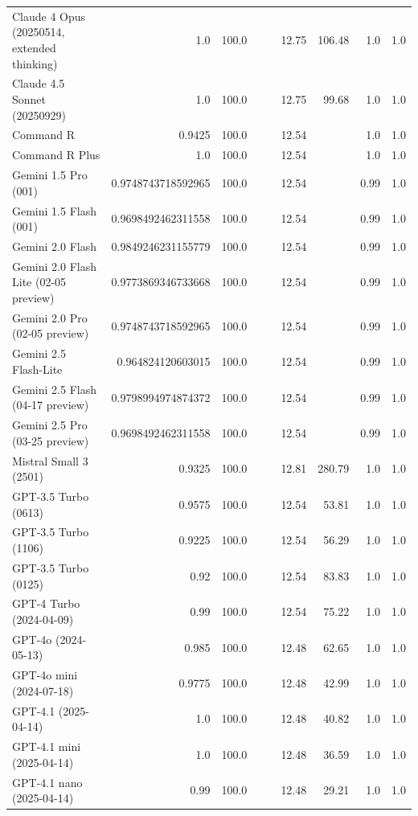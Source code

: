 \begin{table}[htp]
{\begin{tabular}{lrrrrrrrr}
Claude 4 Opus (20250514, extended thinking) & 1.0 & 100.0 &  &  & 12.75 & 106.48 & 1.0 & 1.0 \\
Claude 4.5 Sonnet (20250929) & 1.0 & 100.0 &  &  & 12.75 & 99.68 & 1.0 & 1.0 \\
Command R & 0.9425 & 100.0 &  &  & 12.54 &  & 1.0 & 1.0 \\
Command R Plus & 1.0 & 100.0 &  &  & 12.54 &  & 1.0 & 1.0 \\
Gemini 1.5 Pro (001) & 0.9748743718592965 & 100.0 &  &  & 12.54 &  & 0.99 & 1.0 \\
Gemini 1.5 Flash (001) & 0.9698492462311558 & 100.0 &  &  & 12.54 &  & 0.99 & 1.0 \\
Gemini 2.0 Flash & 0.9849246231155779 & 100.0 &  &  & 12.54 &  & 0.99 & 1.0 \\
Gemini 2.0 Flash Lite (02-05 preview) & 0.9773869346733668 & 100.0 &  &  & 12.54 &  & 0.99 & 1.0 \\
Gemini 2.0 Pro (02-05 preview) & 0.9748743718592965 & 100.0 &  &  & 12.54 &  & 0.99 & 1.0 \\
Gemini 2.5 Flash-Lite & 0.964824120603015 & 100.0 &  &  & 12.54 &  & 0.99 & 1.0 \\
Gemini 2.5 Flash (04-17 preview) & 0.9798994974874372 & 100.0 &  &  & 12.54 &  & 0.99 & 1.0 \\
Gemini 2.5 Pro (03-25 preview) & 0.9698492462311558 & 100.0 &  &  & 12.54 &  & 0.99 & 1.0 \\
Mistral Small 3 (2501) & 0.9325 & 100.0 &  &  & 12.81 & 280.79 & 1.0 & 1.0 \\
GPT-3.5 Turbo (0613) & 0.9575 & 100.0 &  &  & 12.54 & 53.81 & 1.0 & 1.0 \\
GPT-3.5 Turbo (1106) & 0.9225 & 100.0 &  &  & 12.54 & 56.29 & 1.0 & 1.0 \\
GPT-3.5 Turbo (0125) & 0.92 & 100.0 &  &  & 12.54 & 83.83 & 1.0 & 1.0 \\
GPT-4 Turbo (2024-04-09) & 0.99 & 100.0 &  &  & 12.54 & 75.22 & 1.0 & 1.0 \\
GPT-4o (2024-05-13) & 0.985 & 100.0 &  &  & 12.48 & 62.65 & 1.0 & 1.0 \\
GPT-4o mini (2024-07-18) & 0.9775 & 100.0 &  &  & 12.48 & 42.99 & 1.0 & 1.0 \\
GPT-4.1 (2025-04-14) & 1.0 & 100.0 &  &  & 12.48 & 40.82 & 1.0 & 1.0 \\
GPT-4.1 mini (2025-04-14) & 1.0 & 100.0 &  &  & 12.48 & 36.59 & 1.0 & 1.0 \\
GPT-4.1 nano (2025-04-14) & 0.99 & 100.0 &  &  & 12.48 & 29.21 & 1.0 & 1.0 \\

\end{tabular}}
\end{table}
